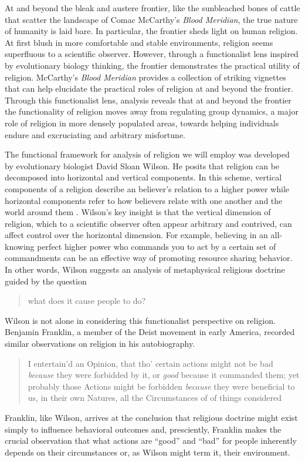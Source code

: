 At and beyond the bleak and austere frontier, like the sunbleached bones of cattle that scatter the landscape of Comac McCarthy's \textit{Blood Meridian}, the true nature of humanity is laid bare.
In particular, the frontier sheds light on human religion.
At first blush in more comfortable and stable environments, religion seems superfluous to a scientific observer.
However, through a functionalist lens inspired by evolutionary biology thinking, the frontier demonstrates the practical utility of religion.
McCarthy's \textit{Blood Meridian} provides a collection of striking vignettes that can help elucidate the practical roles of religion at and beyond the frontier.
Through this functionalist lens, analysis reveals that at and beyond the frontier the functionality of religion moves away from regulating group dynamics, a major role of religion in more densely populated areas, towards helping individuals endure and excruciating and arbitrary misfortune.

The functional framework for analysis of religion we will employ was developed by evolutionary biologist David Sloan Wilson.
He posits that religion can be decomposed into horizontal and vertical components.
In this scheme, vertical components of a religion describe an believer's relation to a higher power while horizontal components refer to how believers relate with one another and the world around them \cite[p 255]{Wilson2007EvolutionLives}.
Wilson's key insight is that the vertical dimension of religion, which to a scientific observer often appear arbitrary and contrived, can affect control over the horizontal dimension.
For example, believing in an all-knowing perfect higher power who commands you to act by a certain set of commandments can be an effective way of promoting resource sharing behavior.
In other words, Wilson suggests an analysis of metaphysical religious doctrine guided by the question \blockcquote[p 256]{Wilson2007EvolutionLives}{what does it cause people to do?}.
Wilson is not alone in considering this functionalist perspective on religion.
Benjamin Franklin, a member of the Deist movement in early America, recorded similar observations on religion in his autobiography.
\blockcquote[p 59]{Franklin2008AutobiographyWritings}{I entertain'd an Opinion, that tho' certain actions might not be bad \textit{because} they were forbidded by it, or \textit{good} because it commanded them; yet probably those Actions might be forbidden \textit{because} they were beneficial to us, in their own Natures, all the Circumstances of of things considered}. Franklin, like Wilson, arrives at the conclusion that religious doctrine might exist simply to influence behavioral outcomes and, presciently, Franklin makes the crucial observation that what actions are ``good'' and ``bad'' for people inherently depends on their circumstances or, as Wilson might term it, their environment.
